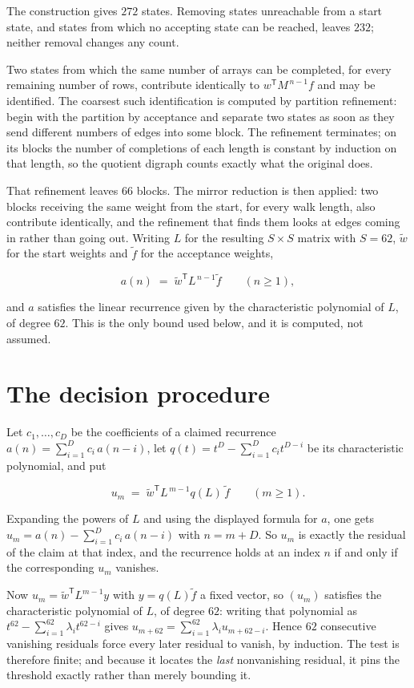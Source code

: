 \documentclass[11pt]{article}
\theoremstyle{definition}
\begin{document}
The construction gives $272$ states. Removing states unreachable from a start state, and states from which no accepting state can be reached, leaves $232$; neither removal changes any count.

Two states from which the same number of arrays can be completed, for every remaining number of rows, contribute identically to $w^{\mathsf T}M^{\,n-1}f$ and may be identified. The coarsest such identification is computed by partition refinement: begin with the partition by acceptance and separate two states as soon as they send different numbers of edges into some block. The refinement terminates; on its blocks the number of completions of each length is constant by induction on that length, so the quotient digraph counts exactly what the original does.

That refinement leaves $66$ blocks. The mirror reduction is then applied: two blocks receiving the same weight from the start, for every walk length, also contribute identically, and the refinement that finds them looks at edges coming in rather than going out. Writing $L$ for the resulting $S \times S$ matrix with $S = 62$, $\tilde w$ for the start weights and $\tilde f$ for the acceptance weights,

\[a(n) \;=\; \tilde w^{\mathsf T} L^{\,n-1} \tilde f \qquad (n \ge 1),\]

and $a$ satisfies the linear recurrence given by the characteristic polynomial of $L$, of degree $62$. This is the only bound used below, and it is computed, not assumed.

\section{The decision procedure}

Let $c_1,\dots,c_D$ be the coefficients of a claimed recurrence $a(n) = \sum_{i=1}^{D} c_i\,a(n-i)$, let $q(t) = t^{D} - \sum_{i=1}^{D} c_i t^{D-i}$ be its characteristic polynomial, and put

\[u_m \;=\; \tilde w^{\mathsf T} L^{\,m-1} q(L)\,\tilde f \qquad (m \ge 1).\]

Expanding the powers of $L$ and using the displayed formula for $a$, one gets $u_m = a(n) - \sum_{i=1}^{D} c_i\,a(n-i)$ with $n = m + D$. So $u_m$ is exactly the residual of the claim at that index, and the recurrence holds at an index $n$ if and only if the corresponding $u_m$ vanishes.

Now $u_m = \tilde w^{\mathsf T} L^{m-1} y$ with $y = q(L)\tilde f$ a fixed vector, so $(u_m)$ satisfies the characteristic polynomial of $L$, of degree $62$: writing that polynomial as $t^{62} - \sum_{i=1}^{62} \lambda_i t^{62-i}$ gives $u_{m+62} = \sum_{i=1}^{62} \lambda_i u_{m+62-i}$. Hence $62$ consecutive vanishing residuals force every later residual to vanish, by induction. The test is therefore finite; and because it locates the {\itshape last} nonvanishing residual, it pins the threshold exactly rather than merely bounding it.
\end{document}
